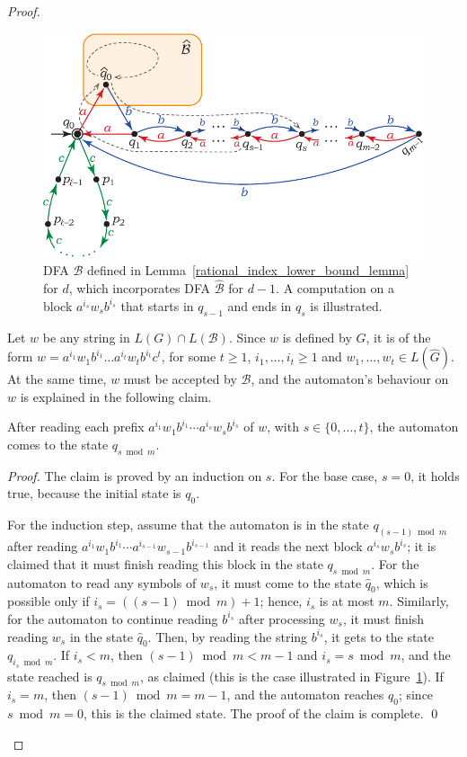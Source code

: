 \documentclass[runningheads]{llncs}
\begin{document}
\begin{proof}
\begin{figure}[t]
	\centering
	\includegraphics[scale=0.9]{rational_index_Ad}
	\caption{DFA $\mathcal{B}$ defined in Lemma~\ref{rational_index_lower_bound_lemma} for $d$,
		which incorporates DFA $\widehat{\mathcal{B}}$ for $d-1$.
		A computation on a block $a^{i_s} w_s b^{i_s}$
		that starts in $q_{s-1}$ and ends in $q_s$ is illustrated.}
	\label{dimautomata:generalized}
\end{figure}

Let $w$ be any string in $L(G) \cap L(\mathcal{B})$.
Since $w$ is defined by $G$,
it is of the form 
$w = a^{i_1} w_1 b^{i_1} \ldots a^{i_t} w_t b^{i_t} c^t$,
for some $t \geqslant 1$,
$i_1, \ldots, i_t \geqslant 1$
and $w_1, \ldots, w_t \in L(\widehat{G})$.
At the same time, $w$ must be accepted by $\mathcal{B}$,
and the automaton's behaviour on $w$ is explained in the following claim.

\begin{claim}
After reading each prefix $a^{i_1} w_1 b^{i_1} \cdots a^{i_s} w_s b^{i_s}$ of $w$,
with $s \in \{0, \ldots, t\}$,
the automaton comes to the state $q_{s \bmod m}$.
\end{claim}
\begin{proof}
The claim is proved by an induction on $s$.
For the base case, $s=0$, it holds true,
because the initial state is $q_0$.

For the induction step,
assume that the automaton is in the state $q_{(s-1) \bmod m}$
after reading $a^{i_1} w_1 b^{i_1} \cdots a^{i_{s-1}} w_{s-1} b^{i_{s-1}}$
and it reads the next block $a^{i_s} w_s b^{i_s}$;
it is claimed that it must finish reading this block
in the state $q_{s \bmod m}$.
For the automaton to read any symbols of $w_s$,
it must come to the state $\widehat{q}_0$,
which is possible only if $i_s = ((s-1) \bmod m) + 1$;
hence, $i_s$ is at most $m$.
Similarly, for the automaton to continue reading $b^{i_s}$
after processing $w_s$,
it must finish reading $w_s$ in the state $\widehat{q}_0$.
Then, by reading the string $b^{i_s}$,
it gets to the state $q_{i_s \bmod m}$.
If $i_s < m$, then $(s-1) \bmod m < m-1$
and $i_s = s \bmod m$, and the state reached is $q_{s \bmod m}$, as claimed
(this is the case illustrated in Figure~\ref{dimautomata:generalized}).
If $i_s = m$, then $(s-1) \bmod m = m-1$,
and the automaton reaches $q_0$; since $s \bmod m = 0$, this is the claimed state.
The proof of the claim is complete.
\qed
\end{proof}


\end{proof}
\end{document}
